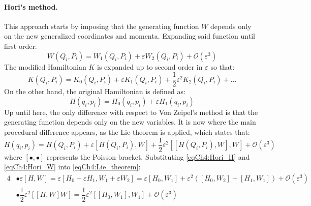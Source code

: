 		\paragraph{Hori's method. \\}
		\indent This approach starts by imposing that the generating function $W$ depends only on the new generalized coordinates and momenta. Expanding said function until first order:
		\begin{equation}
		W(Q_i, P_i) = W_1(Q_i, P_i) + \varepsilon W_2(Q_i, P_i) + \mathcal{O}(\varepsilon^3)
		\label{eqCh4:Hori_W}
		\end{equation}
		\indent The modified Hamiltonian $K$ is expanded up to second order in $\varepsilon$ so that:
		\begin{equation}
		K(Q_i, P_i) = K_0(Q_i, P_i) + \varepsilon K_1 (Q_i, P_i) + \dfrac{1}{2} \varepsilon^2 K_2 (Q_i, P_i) + \ldots
		\label{eqCh4:Hori_K}
		\end{equation}
		\indent On the other hand, the original Hamiltonian is defined as:
		\begin{equation}
		H(q_i, p_i) = H_0(q_i, p_i) + \varepsilon H_1 (q_i, p_i)
		\label{eqCh4:Hori_H}
		\end{equation}
		\indent Up until here, the only difference with respect to Von Zeipel's method is that the generating function depends only on the new variables. It is now where the main procedural difference appears, as the Lie theorem is applied, which states that:
		\begin{equation}
		H(q_i, p_i) = H(Q_i, P_i) + \varepsilon \left[ H(Q_i, P_i), W\right] + \dfrac{1}{2} \varepsilon^2 \left[ \left[ H(Q_i, P_i), W \right], W \right] + \mathcal{O} (\varepsilon^3)
		\label{eqCh4:Lie_theorem}
		\end{equation}
		\noindent where $[\bullet, \bullet]$ represents the Poisson bracket. Substituting \eqref{eqCh4:Hori_H} and \eqref{eqCh4:Hori_W} into \eqref{eqCh4:Lie_theorem}:
		\begin{alignat}{4}
		& \nonumber \bullet \varepsilon \left[ H, W \right] = \varepsilon \left[ H_0 + \varepsilon H_1, W_1 + \varepsilon W_2 \right] = \varepsilon \left[ H_0, W_1 \right] + \varepsilon^2 \left( \left[ H_0, W_2 \right] + \left[ H_1, W_1 \right] \right) + \mathcal{O}(\varepsilon^3) \\
		& \nonumber \bullet \dfrac{1}{2}\varepsilon^2 \left[ \left[ H, W \right] W\right] = \dfrac{1}{2} \varepsilon^2 \left[ \left[ H_0, W_1 \right], W_1 \right] + \mathcal{O}(\varepsilon^3)
		\end{alignat}
